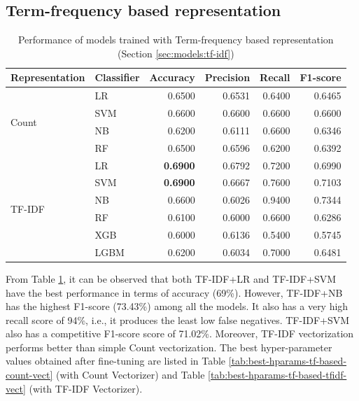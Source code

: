 \subsection{Term-frequency based representation}
\label{sec:results:tf-idf}

\begin{table}[htpb]
\centering
\begin{tabular}{llrrrr}
\hline
\textbf{Representation} & \textbf{Classifier} & \multicolumn{1}{l}{\textbf{Accuracy}} & \multicolumn{1}{l}{\textbf{Precision}} & \multicolumn{1}{l}{\textbf{Recall}} & \multicolumn{1}{l}{\textbf{F1-score}} \\ \hline
\multirow{4}{*}{Count} & LR & 0.6500 & 0.6531 & 0.6400 & 0.6465 \\ 
 & SVM & 0.6600 & 0.6600 & 0.6600 & 0.6600 \\ 
 & NB & 0.6200 & 0.6111 & 0.6600 & 0.6346 \\ 
 & RF & 0.6500 & 0.6596 & 0.6200 & 0.6392 \\ \hline
\multirow{6}{*}{TF-IDF} & LR & \textbf{0.6900} & 0.6792 & 0.7200 & 0.6990 \\ 
 & SVM & \textbf{0.6900} & 0.6667 & 0.7600 & 0.7103 \\ 
 & NB & 0.6600 & 0.6026 & 0.9400 & {0.7344} \\ 
 & RF & 0.6100 & 0.6000 & 0.6600 & 0.6286 \\ 
 & XGB & 0.6000 & 0.6136 & 0.5400 & 0.5745 \\ 
 & LGBM & 0.6200 & 0.6034 & 0.7000 & 0.6481 \\ \hline
\end{tabular}
\caption{Performance of models trained with Term-frequency based representation (Section \ref{sec:models:tf-idf})}
\label{tab:results:performance-tf-based}
\end{table}

From Table \ref{tab:results:performance-tf-based}, it can be observed that both \ac{TF-IDF}+\ac{LR} and \ac{TF-IDF}+\ac{SVM} have the best performance in terms of accuracy (69\%). However, \ac{TF-IDF}+\ac{NB} has the highest F1-score (73.43\%) among all the models. It also has a very high recall score of 94\%, i.e., it produces the least low false negatives. \ac{TF-IDF}+\ac{SVM} also has a competitive F1-score score of 71.02\%. Moreover, \ac{TF-IDF} vectorization performs better than simple Count vectorization. The best hyper-parameter values obtained after fine-tuning are listed in Table \ref{tab:best-hparams-tf-based-count-vect} (with Count Vectorizer) and Table \ref{tab:best-hparams-tf-based-tfidf-vect} (with \ac{TF-IDF} Vectorizer).


